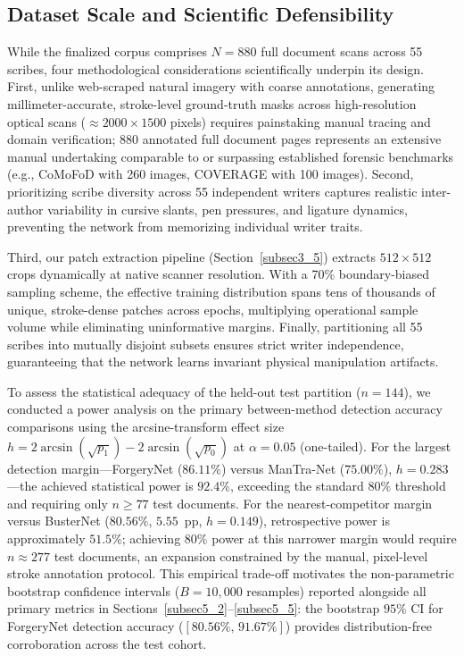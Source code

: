 \documentclass[pdflatex,sn-mathphys-num,iicol]{sn-jnl}
\begin{document}
\subsection{Dataset Scale and Scientific Defensibility}\label{subsec3_3}
While the finalized corpus comprises $N = 880$ full document scans across 55 scribes, four methodological considerations scientifically underpin its design. First, unlike web-scraped natural imagery with coarse annotations, generating millimeter-accurate, stroke-level ground-truth masks across high-resolution optical scans ($\approx 2000 \times 1500$ pixels) requires painstaking manual tracing and domain verification; 880 annotated full document pages represents an extensive manual undertaking comparable to or surpassing established forensic benchmarks (e.g., CoMoFoD with 260 images, COVERAGE with 100 images). Second, prioritizing scribe diversity across 55 independent writers captures realistic inter-author variability in cursive slants, pen pressures, and ligature dynamics, preventing the network from memorizing individual writer traits.

Third, our patch extraction pipeline (Section~\ref{subsec3_5}) extracts $512 \times 512$ crops dynamically at native scanner resolution. With a 70\% boundary-biased sampling scheme, the effective training distribution spans tens of thousands of unique, stroke-dense patches across epochs, multiplying operational sample volume while eliminating uninformative margins. Finally, partitioning all 55 scribes into mutually disjoint subsets ensures strict writer independence, guaranteeing that the network learns invariant physical manipulation artifacts.

To assess the statistical adequacy of the held-out test partition ($n = 144$), we conducted a power analysis on the primary between-method detection accuracy comparisons using the arcsine-transform effect size $h = 2\arcsin(\sqrt{p_1}) - 2\arcsin(\sqrt{p_0})$ at $\alpha = 0.05$ (one-tailed). For the largest detection margin---ForgeryNet ($86.11\%$) versus ManTra-Net ($75.00\%$), $h = 0.283$---the achieved statistical power is $\mathbf{92.4\%}$, exceeding the standard $80\%$ threshold and requiring only $n \ge 77$ test documents. For the nearest-competitor margin versus BusterNet ($80.56\%$, $5.55$~pp, $h = 0.149$), retrospective power is approximately $51.5\%$; achieving $80\%$ power at this narrower margin would require $n \approx 277$ test documents, an expansion constrained by the manual, pixel-level stroke annotation protocol. This empirical trade-off motivates the non-parametric bootstrap confidence intervals ($B = 10{,}000$ resamples) reported alongside all primary metrics in Sections~\ref{subsec5_2}--\ref{subsec5_5}: the bootstrap $95\%$ CI for ForgeryNet detection accuracy ($[80.56\%,\, 91.67\%]$) provides distribution-free corroboration across the test cohort.
\end{document}
